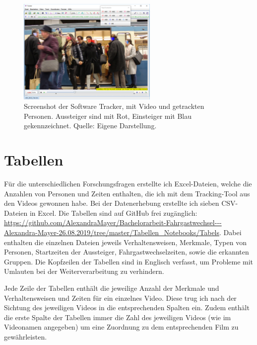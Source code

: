 \begin{figure}[H]
	\centering
		\includegraphics[width=0.6\textwidth]{pictures/data_extraction/tracking/trackExample.png}
	\caption{Screenshot der Software \textsf{Tracker}, mit Video und getrackten Personen. Aussteiger sind mit Rot, Einsteiger mit Blau gekennzeichnet. Quelle: Eigene Darstellung.}
	\label{fig:tracking}
\end{figure}
\section{Tabellen} \label{Tabellen}
\begin{sloppypar}
Für die unterschiedlichen Forschungsfragen erstellte ich Excel-Dateien, welche die Anzahlen von Personen und Zeiten enthalten, die ich mit dem Tracking-Tool aus den Videos gewonnen habe. Bei der Datenerhebung erstellte ich sieben CSV-Dateien in Excel. Die Tabellen sind auf GitHub frei zugänglich: \url{https://github.com/AlexandraMayer/Bachelorarbeit-Fahrgastwechsel---Alexandra-Mayer-26.08.2019/tree/master/Tabellen_Notebooks/Tabels}. Dabei enthalten die einzelnen Dateien jeweils  Verhaltensweisen, Merkmale, Typen von Personen, Startzeiten der Aussteiger, Fahrgastwechselzeiten, sowie die erkannten Gruppen. Die Kopfzeilen der Tabellen sind in Englisch verfasst, um Probleme mit Umlauten bei der Weiterverarbeitung zu verhindern. 
\end{sloppypar}
Jede Zeile der Tabellen enthält die jeweilige Anzahl der Merkmale und Verhaltensweisen und Zeiten für ein einzelnes Video. Diese trug ich nach der Sichtung des jeweiligen Videos in die entsprechenden Spalten ein. Zudem enthält die erste Spalte der Tabellen immer die Zahl des jeweiligen Videos (wie im Videonamen angegeben) um eine Zuordnung zu dem entsprechenden Film zu gewährleisten.
